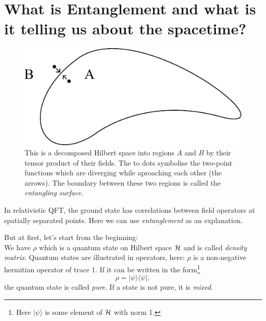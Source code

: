\section{What is Entanglement and what is it telling us about the spacetime? \checkmark}
\FloatBarrier	
	\begin{figure}[tbp]
		\begin{center}
			\includegraphics[scale=1]{entangledcorr}
			\caption{This is a decomposed Hilbert space into regions $A$ and $B$ by their tensor product of their fields. The to dots symbolise the two-point functions which are diverging while aproaching each other (the arrows). The boundary between these two regions is called the \textit{entangling surface}.} \label{entangling_surface}
		\end{center}
	\end{figure}		
	In relativistic QFT, the ground state has correlations between field operators at spatially separated points. Here we can use \textit{entanglement} as an explanation.
	
	But at first, let's start from the beginning:
	\\
	We have $\rho$ which is a quantum state on Hilbert space $\mathcal{H}$ and is called \textit{density matrix}. Quantum states are illustrated in operators, here: $\rho$ is a non-negative hermitian operator of trace 1. If it can be written in the form\footnote{Here $|\psi\rangle$ is some element of $\mathcal{H}$ with norm 1.}
		\begin{equation}
			\rho=|\psi\rangle \langle\psi|,
		\end{equation}
	 the quantum state is called \textit{pure}. If a state is not pure, it is \textit{mixed}.
	 
